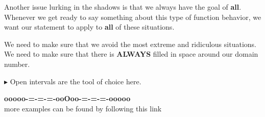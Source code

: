 \documentclass{ximera}
\begin{document}
Another issue lurking in the shadows is that we always have the goal of \textbf{\textcolor{red!70!black}{all}}. Whenever we get ready to say something about this type of function behavior, we want our statement to apply to \textbf{\textcolor{red!70!black}{all}} of these situations. 

We need to make sure that we avoid the most extreme and ridiculous situations.  We need to make sure that there is \textbf{\textcolor{red!70!black}{ALWAYS}} filled in space around our domain number.




\textbf{\textcolor{red!70!darkgray}{$\blacktriangleright$}} Open intervals are the tool of choice here.













\begin{onlineOnly}
\begin{center}
\textbf{\textcolor{green!50!black}{ooooo-=-=-=-ooOoo-=-=-=-ooooo}} \\

more examples can be found by following this link\\ 

\end{center}
\end{onlineOnly}
\end{document}
